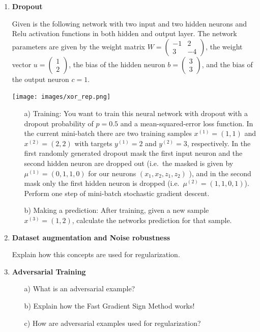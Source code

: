 \documentclass[paper=a4, fontsize=11pt]{scrartcl} %
\numberwithin{equation}{section} %
\numberwithin{figure}{section} %
\numberwithin{table}{section} %
\begin{document}
\begin{enumerate}
\item \textbf{Dropout}

Given is the following network with two input and two hidden neurons and Relu activation functions in both hidden and output layer. The network parameters are given by the weight matrix
$W=
\begin{pmatrix}
-1 & 2 \\
3 & -4
\end{pmatrix}$,
the weight vector
$u=
\begin{pmatrix}
1 \\
2
\end{pmatrix}$,
the bias of the hidden neuron 
$b=
\begin{pmatrix}
3\\
3
\end{pmatrix}$,
and the bias of the output neuron $c=1$.
\begin{center}
\texttt{[image: images/xor\_rep.png]}
\end{center}
\begin{itemize}
\item[a)]  Training: You want to train this neural network with dropout with a dropout probability of $p=0.5$ and a mean-squared-error loss function. In the current mini-batch there are two training samples $x^{(1)}=(1,1)$ and $x^{(2)}=(2,2)$ with targets $y^{(1)}=2$ and $y^{(2)}=3$, respectively.
In the first randomly generated dropout mask the first input neuron and the second hidden neuron are dropped out (i.e.~the masked is given by $\mu^{(1)}=(0,1,1,0)$ for our neurons $(x_1,x_2,z_1,z_2)$ ), and in the second mask only the first hidden neuron is dropped (i.e.~$\mu^{(2)}=(1,1,0,1)$). Perform one step of mini-batch stochastic gradient descent. 
\item[b)] Making a prediction: After training, given a new sample  $x^{(3)}=(1,2)$, calculate the networks prediction for that sample.
\end{itemize}

\item \textbf{Dataset augmentation and Noise robustness}

Explain how this concepts are used for regularization. 

\item \textbf{Adversarial Training}
\begin{itemize}
\item[a)] What is an adversarial example?
\item[b)] Explain how the Fast Gradient Sign Method works! 
\item[c)] How are adversarial examples used for regularization?
\end{itemize}


\end{enumerate}


\end{document}
